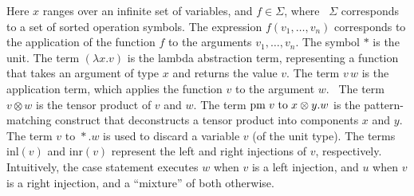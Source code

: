 Here $x$ ranges over an infinite set of variables, and $f \in \Sigma$, where  $\Sigma$ corresponds to a set of sorted operation symbols. The expression $f(v_1, \ldots, v_n)$ corresponds to the application of the function $f$ to the arguments $v_1, \ldots, v_n$. The symbol $*$ is the unit. The term $(\lambda x. v )$ is the lambda abstraction term, representing a function that takes an argument of type $x$ and returns the value $v$. The term $v \,w$ is the application term, which applies the function $v$ to the argument $w$.  The term $v \otimes w$ is the tensor product of $v$ and $w$. The term $\text{pm} \hspace{3 pt} v \hspace{3 pt} \text{to} \hspace{3 pt} x \otimes y. w$ is the pattern-matching construct that deconstructs a tensor product into components $x$ and $y$. The term $v \text{ to } *.w$ is used to discard a variable $v$ (of the unit type). The terms $\text{inl}(v)$ and $\text{inr}(v)$ represent the left and right injections of $v$, respectively. Intuitively, the case statement executes $w$ when $v$ is a left injection, and $u$ when $v$ is a right injection, and a ``mixture'' of both otherwise.









